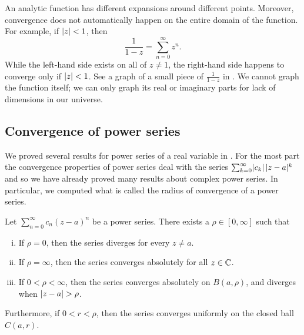 An analytic function has different expansions around different points.
Moreover, convergence does not automatically happen on the entire
domain of the function.  For example, if $\lvert {z} \rvert < 1$, then
\begin{equation*}
\frac{1}{1-z} = \sum_{n=0}^\infty z^n .
\end{equation*}
While the left-hand side exists on all of $z \neq 1$, the right-hand side
happens to converge only if $\lvert {z} \rvert < 1$.  See a graph
of a small piece of $\frac{1}{1-z}$ in .
We cannot graph the
function itself; we can only graph its real or imaginary parts for lack
of dimensions in our universe.

\begin{myfigureht}
\caption{Graphs of the real and imaginary parts of $z=x+iy \mapsto \frac{1}{1-z}$
in the square $[-0.8,0.8]^2$.  The singularity at $z=1$ is marked with a
vertical dashed line.\label{fig:1over1mz}}
\end{myfigureht}

\subsection{Convergence of power series}

We proved several results for power series of a real variable in
.   For the most part the convergence
properties of power series deal with the series
$\sum_{k=0}^\infty \lvert {c_k} \rvert \, \lvert {z-a} \rvert^k$
and so we have already proved many results about complex power
series.  In particular, we computed what is called the
radius of convergence of a power series.

\begin{prop}
\pagebreak[2]
Let $\sum_{n=0}^\infty c_n {(z-a)}^n$ be a power series.
There exists a $\rho \in [0,\infty]$ such that
\begin{enumerate}[(i)]
\item If $\rho = 0$, then the series diverges for every $z \neq a$.
\item If $\rho = \infty$, then the series converges absolutely for all $z \in {\mathbb{C}}$.
\item If $0 < \rho < \infty$, then the
series converges absolutely on $B(a,\rho)$,
and diverges when $\lvert {z-a} \rvert > \rho$.
\end{enumerate}
Furthermore, if $0 < r < \rho$, then
the series converges uniformly on the closed ball $C(a,r)$.
\end{prop}

